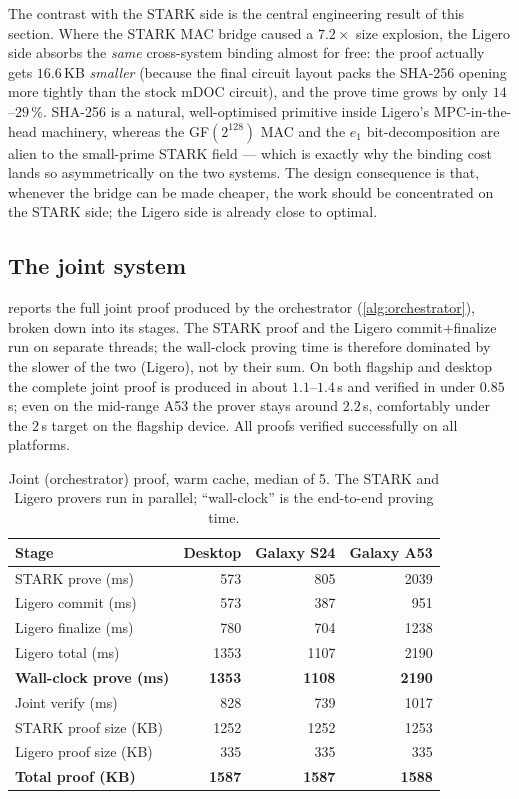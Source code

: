 \documentclass{article}
\begin{document}
The contrast with the STARK side is the central engineering result of this
section. Where the STARK MAC bridge caused a $7.2\times$ size explosion, the
Ligero side absorbs the \emph{same} cross-system binding almost for free: the
proof actually gets $16.6$\,KB \emph{smaller} (because the final circuit layout
packs the SHA-256 opening more tightly than the stock mDOC circuit), and the prove
time grows by only $14$--$29\,\%$. SHA-256 is a natural, well-optimised primitive
inside Ligero's MPC-in-the-head machinery, whereas the GF$(2^{128})$ MAC and the
$e_1$ bit-decomposition are alien to the small-prime STARK field --- which is
exactly why the binding cost lands so asymmetrically on the two systems. The
design consequence is that, whenever the bridge can be made cheaper, the work
should be concentrated on the STARK side; the Ligero side is already close to
optimal.

\subsection{The joint system}
\label{results:joint}
 reports the full joint proof produced by the
orchestrator (\cref{alg:orchestrator}), broken down into its stages. The STARK
proof and the Ligero commit+finalize run on separate threads; the wall-clock
proving time is therefore dominated by the slower of the two (Ligero), not by
their sum. On both flagship and desktop the complete joint proof is produced in
about $1.1$--$1.4$\,s and verified in under $0.85$\,s; even on the mid-range
A53 the prover stays around $2.2$\,s, comfortably under the $2$\,s target on the
flagship device. All proofs verified successfully on all platforms.

\begin{table}[ht]
  \centering
  \caption{Joint (orchestrator) proof, warm cache, median of 5. The STARK and
  Ligero provers run in parallel; ``wall-clock'' is the end-to-end proving time.}
  \label{tab:res-orchestrator}
  \small
  \begin{tabular}{@{}lrrr@{}}
    \toprule
    \textbf{Stage} & \textbf{Desktop} & \textbf{Galaxy S24} & \textbf{Galaxy A53} \\
    \midrule
    STARK prove (ms)            & 573  & 805  & 2039 \\
    Ligero commit (ms)          & 573  & 387  & 951  \\
    Ligero finalize (ms)        & 780  & 704  & 1238 \\
    Ligero total (ms)           & 1353 & 1107 & 2190 \\
    \textbf{Wall-clock prove (ms)} & \textbf{1353} & \textbf{1108} & \textbf{2190} \\
    Joint verify (ms)           & 828  & 739  & 1017 \\
    \midrule
    STARK proof size (KB)       & 1252 & 1252 & 1253 \\
    Ligero proof size (KB)      & 335  & 335  & 335  \\
    \textbf{Total proof (KB)}   & \textbf{1587} & \textbf{1587} & \textbf{1588} \\
    \bottomrule
  \end{tabular}
\end{table}
\end{document}
